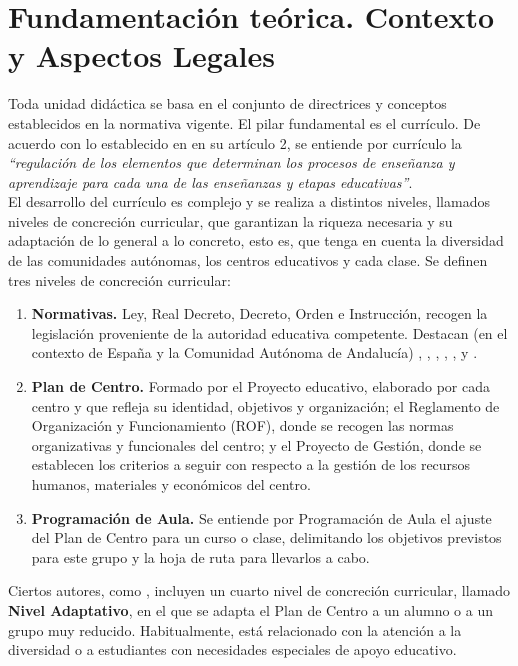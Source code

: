 \documentclass[../main.tex]{book}
\begin{document}
\chapter{Fundamentación teórica. Contexto y Aspectos Legales}
\label{sec:fund-teorica}

Toda unidad didáctica se basa en el conjunto de directrices y conceptos establecidos en la normativa vigente. El pilar fundamental es el currículo. De acuerdo con lo establecido en \cite{RD1105} en su artículo 2, se entiende por currículo la \textit{``regulación de los elementos que determinan los procesos de enseñanza y aprendizaje para cada una de las enseñanzas y etapas educativas''}. \\

El desarrollo del currículo es complejo y se realiza a distintos niveles, llamados niveles de concreción curricular, que garantizan la riqueza necesaria y su adaptación de lo general a lo concreto, esto es, que tenga  en cuenta la diversidad  de las comunidades autónomas, los centros educativos y cada clase. Se definen tres niveles de concreción curricular:

\begin{enumerate}
	\item \textbf{Normativas.} Ley, Real Decreto, Decreto, Orden e Instrucción, recogen la legislación proveniente de la autoridad educativa competente. Destacan (en el contexto de España y la Comunidad Autónoma de Andalucía) \cite{organica32020}, \cite{RD1105}, \cite{decreto182}, \cite{decreto110}, \cite{orden1512021}, \cite{ecd652015} y \cite{instruccion92020}.
	
	\item \textbf{Plan de Centro.} Formado por el Proyecto educativo, elaborado por cada centro y que refleja su identidad, objetivos y organización; el Reglamento de Organización y Funcionamiento (ROF), donde se recogen las normas organizativas y funcionales del centro; y el Proyecto de Gestión, donde se establecen los criterios a seguir con respecto a la gestión de los recursos humanos, materiales y económicos del centro.
	
	\item \textbf{Programación de Aula.} Se entiende por Programación de Aula el ajuste del Plan de Centro para un curso o clase, delimitando los objetivos previstos para este grupo y la hoja de ruta para llevarlos a cabo.
\end{enumerate}

Ciertos autores, como \cite{cabrerizo2007}, incluyen un cuarto nivel de concreción curricular, llamado \textbf{Nivel Adaptativo}, en el que se adapta el Plan de Centro a un alumno o a un grupo muy reducido. Habitualmente, está relacionado con la atención a la diversidad o a estudiantes con necesidades especiales de apoyo educativo. \\
\end{document}
